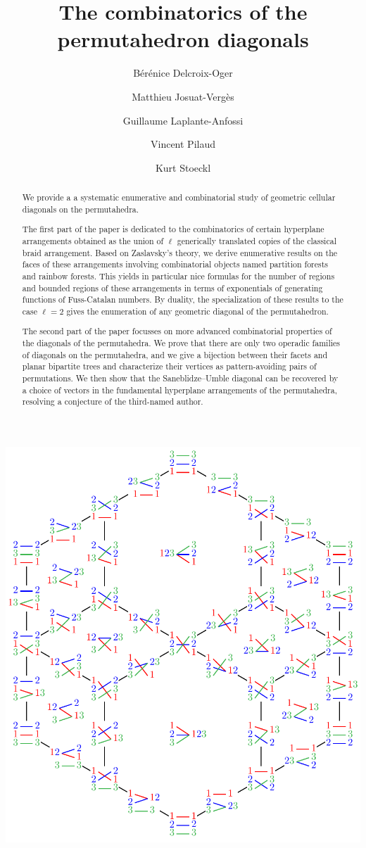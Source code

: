 \documentclass{amsart}
\title{The combinatorics of the permutahedron diagonals}
\author[B. Delcroix-Oger]{B\'er\'enice Delcroix-Oger}
\author[M. Josuat-Verg\`es]{Matthieu Josuat-Verg\`es}
\author[G. Laplante-Anfossi]{Guillaume Laplante-Anfossi}
\author[V. Pilaud]{Vincent Pilaud}
\author[K. Stoeckl]{Kurt Stoeckl}
\theoremstyle{definition}
\begin{document}
\begin{abstract}
We provide a a systematic enumerative and combinatorial study of geometric cellular diagonals on the permutahedra. 

The first part of the paper is dedicated to the combinatorics of certain hyperplane arrangements obtained as the union of $\ell$ generically translated copies of the classical braid arrangement.
Based on Zaslavsky's theory, we derive enumerative results on the faces of these arrangements involving combinatorial objects named partition forests and rainbow forests.
This yields in particular nice formulas for the number of regions and bounded regions of these arrangements in terms of exponentials of generating functions of Fuss-Catalan numbers.
By duality, the specialization of these results to the case $\ell = 2$ gives the enumeration of any geometric diagonal of the permutahedron.

The second part of the paper focusses on more advanced combinatorial properties of the diagonals of the permutahedra.
We prove that there are only two operadic families of diagonals on the permutahedra, and we give a bijection between their facets and planar bipartite trees and characterize their vertices as pattern-avoiding pairs of permutations.
We then show that the Saneblidze--Umble diagonal can be recovered by a choice of vectors in the fundamental hyperplane arrangements of the permutahedra, resolving a conjecture of the third-named author.  
\end{abstract}

\vspace*{-.5cm}
\maketitle

\vspace*{-.2cm}
\centerline{\includegraphics[scale=.85]{diagonalPermutahedron3}}
\end{document}
